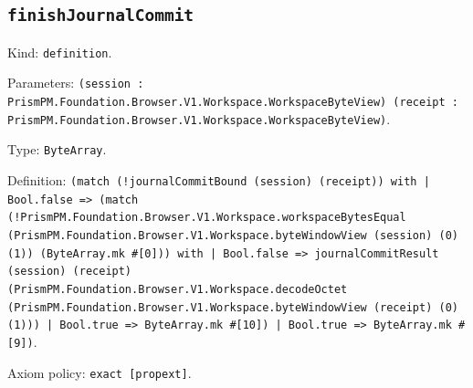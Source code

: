 \documentclass[11pt]{article}
\begin{document}
\subsection*{\texttt{finishJournalCommit}}
\noindent Kind: \texttt{definition}.\par
\noindent Parameters: \texttt{(session : PrismPM.Foundation.Browser.V1.Workspace.WorkspaceByteView) (receipt : PrismPM.Foundation.Browser.V1.Workspace.WorkspaceByteView)}.\par
\noindent Type: \texttt{ByteArray}.\par
\noindent Definition: \texttt{(match (!journalCommitBound (session) (receipt)) with | Bool.false => (match (!PrismPM.Foundation.Browser.V1.Workspace.workspaceBytesEqual (PrismPM.Foundation.Browser.V1.Workspace.byteWindowView (session) (0) (1)) (ByteArray.mk \#[0])) with | Bool.false => journalCommitResult (session) (receipt) (PrismPM.Foundation.Browser.V1.Workspace.decodeOctet (PrismPM.Foundation.Browser.V1.Workspace.byteWindowView (receipt) (0) (1))) | Bool.true => ByteArray.mk \#[10]) | Bool.true => ByteArray.mk \#[9])}.\par
\noindent Axiom policy: \texttt{exact [propext]}.\par
\end{document}
